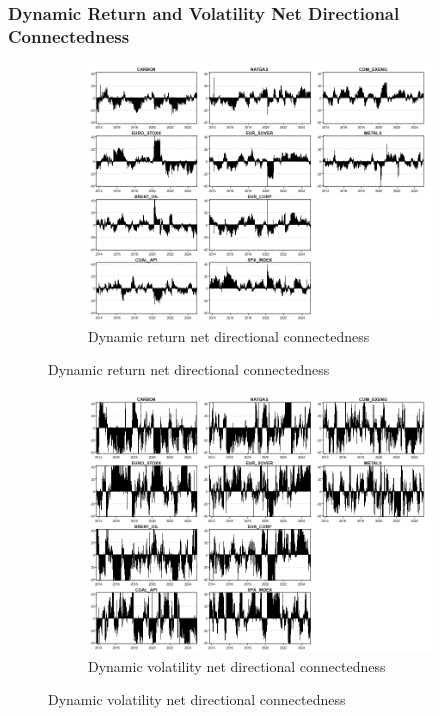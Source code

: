 \documentclass[preprint, 3p,
authoryear]{elsarticle} %
\begin{document}
\begin{landscape}
\subsubsection{Dynamic Return and Volatility Net Directional Connectedness}

\begin{figure}[H]
  \caption{Dynamic Net Directional Connectedness (Jan 2013 – Jan 2025)}
    \centering
      \begin{subfigure}[a]{\textwidth}
        \caption{Dynamic return net directional connectedness}
        \includegraphics[width = 1.25\linewidth]{8aApdxD-10-180-RetNDC}
      \end{subfigure}
\end{figure}
\begin{figure}[H]
  \ContinuedFloat
  \centering
      \begin{subfigure}[b]{\textwidth}
        \caption{Dynamic volatility net directional connectedness}
        \includegraphics[width = 1.25\linewidth]{8bApdxD-10-180-VolNDC}
      \end{subfigure}
\end{figure}




\end{landscape}
\end{document}
